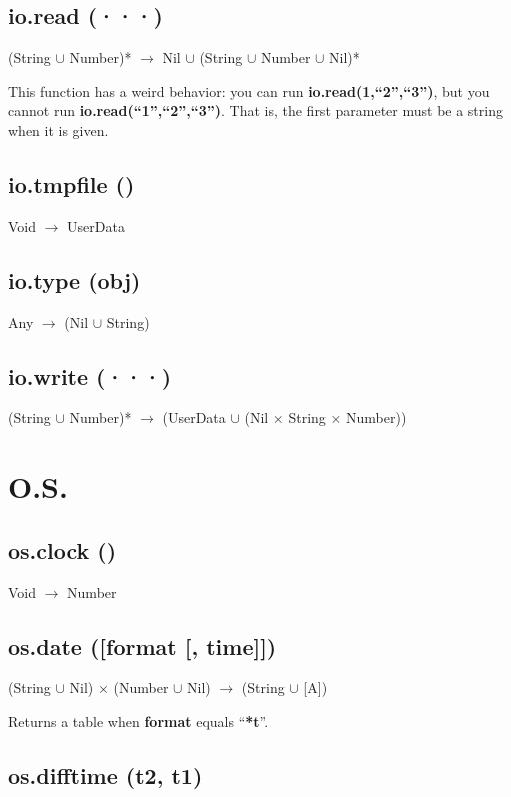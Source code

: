 \documentclass[12pt]{article}
\begin{document}
\subsection{io.read (···)}

(String $\cup$ Number)* $\rightarrow$
Nil $\cup$ (String $\cup$ Number $\cup$ Nil)* 

This function has a weird behavior: you can run 
\textbf{io.read(1,``2'',``3'')}, but you cannot run 
\textbf{io.read(``1'',``2'',``3'')}.
That is, the first parameter must be a string when it is given.

\subsection{io.tmpfile ()}

Void $\rightarrow$ UserData

\subsection{io.type (obj)}

Any $\rightarrow$
(Nil $\cup$ String)

\subsection{io.write (···)}

(String $\cup$ Number)* $\rightarrow$
(UserData $\cup$ (Nil $\times$ String $\times$ Number))

\newpage

\section{O.S.}

\subsection{os.clock ()}

Void $\rightarrow$ Number

\subsection{os.date ([format [, time]])}

(String $\cup$ Nil) $\times$
(Number $\cup$ Nil) $\rightarrow$
(String $\cup$ [A])

Returns a table when \textbf{format} equals ``\textbf{*t}''.

\subsection{os.difftime (t2, t1)}
\end{document}
